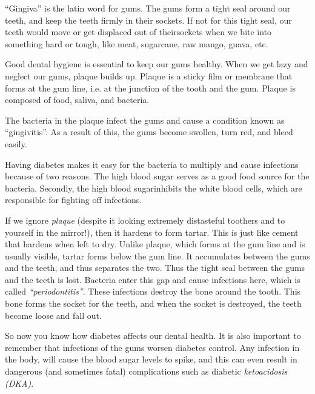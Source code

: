 “Gingiva” is the latin word for gums. The gums form a tight seal around our teeth, and keep the teeth firmly in their sockets. If not for this tight seal, our teeth would move or get displaced out of their\break sockets when we bite into something hard or tough, like meat, sugarcane, raw mango, guava, etc.

Good dental hygiene is essential to keep our gums healthy. When we get lazy and neglect our gums, plaque builds up. Plaque is a sticky film or membrane that forms at the gum line, i.e. at the junction of the tooth and the gum. Plaque is composed of food, saliva, and bacteria.

The bacteria in the plaque infect the gums and cause a condition known as “gingivitis”. As a result of this, the gums become swollen, turn red, and bleed easily.

Having diabetes makes it easy for the bacteria to multiply and cause infections because of two reasons. The high blood sugar serves as a good food source for the bacteria. Secondly, the high blood sugar\break inhibits the white blood cells, which are responsible for fighting off infections.

If we ignore \textit{plaque} (despite it looking extremely distasteful to\break others and to yourself in the mirror!), then it hardens to form tartar. This is just like cement that hardens when left to dry. Unlike plaque, which forms at the gum line and is usually visible, tartar forms below the gum line. It accumulates between the gums and the teeth, and thus separates the two. Thus the tight seal between the gums and the teeth is lost. Bacteria enter this gap and cause infections here, which is called \textit{“periodontitis”}. These infections destroy the bone around the tooth. This bone forms the socket for the teeth, and when the socket is destroyed, the teeth become loose and fall out.

So now you know how diabetes affects our dental health. It is also important to remember that infections of the gums worsen diabetes control. Any infection in the body, will cause the blood sugar levels to spike, and this can even result in dangerous (and sometimes fatal) complications such as diabetic \textit{ketoacidosis (DKA)}.

